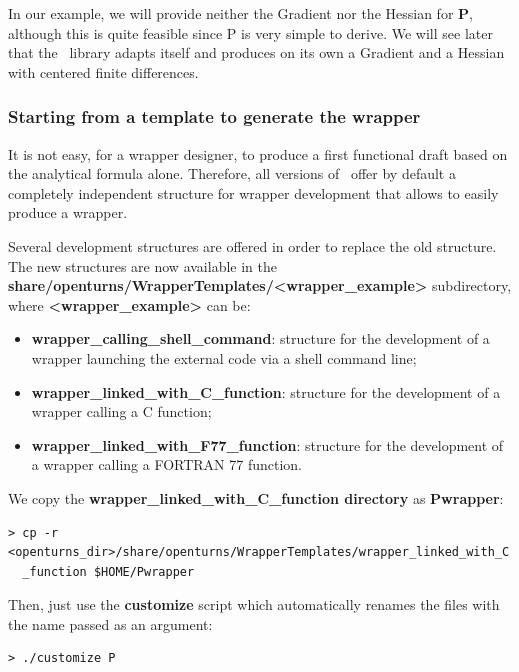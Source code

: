 In our example, we will provide neither the Gradient nor the Hessian for {\bf P}, although this is quite feasible since P is very simple to derive. We will see later that the \OT\ library adapts itself and produces on its own a Gradient and a Hessian with centered finite differences.

\subsubsection{Starting from a template to generate the wrapper}

It is not easy, for a wrapper designer, to produce a first functional draft based on the analytical formula alone. Therefore, all versions of \OT\ offer by default a completely independent structure for wrapper development that allows to easily produce a wrapper.

Several development structures are offered in order to replace the old structure. The new structures are now available in the {\bf share/openturns/WrapperTemplates/<wrapper\_example>} subdirectory, where {\bf {}<wrapper\_example>} can be:
\begin{itemize}
\item {\bf wrapper\_calling\_shell\_command}: structure for the development of a wrapper launching the external code via a shell command line;
\item {\bf wrapper\_linked\_with\_C\_function}: structure for the development of a wrapper calling a C function;
\item {\bf wrapper\_linked\_with\_F77\_function}: structure for the development of a wrapper calling a FORTRAN 77 function.
\end{itemize}

We copy the {\bf {}wrapper\_linked\_with\_C\_function directory} as {\bf Pwrapper}:

\lstset{language=Bash, basicstyle=\normalsize}
\begin{lstlisting}[frame=TBRL]
  > cp -r <openturns_dir>/share/openturns/WrapperTemplates/wrapper_linked_with_C
  _function $HOME/Pwrapper
\end{lstlisting}

Then, just use the {\bf customize} script which automatically renames the files with the name passed as an argument:

\lstset{language=Bash, basicstyle=\normalsize}
\begin{lstlisting}[frame=TBRL]
  > ./customize P
\end{lstlisting}

